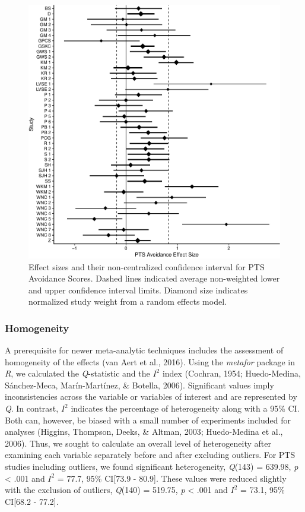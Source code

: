 \documentclass[english,man]{apa6}
\theoremstyle{definition}
\theoremstyle{definition}
\theoremstyle{definition}
\theoremstyle{remark}
\begin{document}
\begin{figure}
\centering
\includegraphics{meta_markdown_files/figure-latex/ptspicavoid-1.pdf}
\caption{\label{fig:ptspicavoid}Effect sizes and their non-centralized
confidence interval for PTS Avoidance Scores. Dashed lines indicated
average non-weighted lower and upper confidence interval limits. Diamond
size indicates normalized study weight from a random effects model.}
\end{figure}

\subsubsection{Homogeneity}\label{homogeneity}

A prerequisite for newer meta-analytic techniques includes the
assessment of homogeneity of the effects (van Aert et al., 2016). Using
the \emph{metafor} package in \emph{R}, we calculated the
\emph{Q}-statistic and the \(I^2\) index (Cochran, 1954; Huedo-Medina,
Sánchez-Meca, Marín-Martínez, \& Botella, 2006). Significant values
imply inconsistencies across the variable or variables of interest and
are represented by \emph{Q}. In contrast, \(I^2\) indicates the
percentage of heterogeneity along with a 95\% CI. Both can, however, be
biased with a small number of experiments included for analyses
(Higgins, Thompson, Deeks, \& Altman, 2003; Huedo-Medina et al., 2006).
Thus, we sought to calculate an overall level of heterogeneity after
examining each variable separately before and after excluding outliers.
For PTS studies including outliers, we found significant heterogeneity,
\emph{Q}(143) = 639.98, \emph{p} \textless{} .001 and \(I^2\) = 77.7,
95\% CI{[}73.9 - 80.9{]}. These values were reduced slightly with the
exclusion of outliers, \emph{Q}(140) = 519.75, \emph{p} \textless{} .001
and \(I^2\) = 73.1, 95\% CI{[}68.2 - 77.2{]}.
\end{document}
